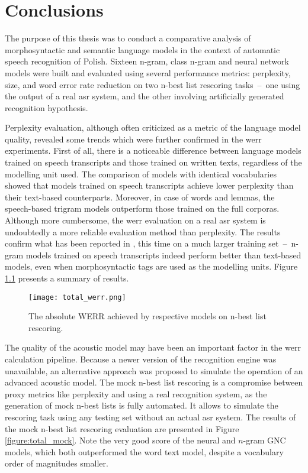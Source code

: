 \chapter{Conclusions}
\label{chapter:conclusion}
The purpose of this thesis was to conduct a comparative analysis of morphosyntactic and semantic language models in the context of automatic speech recognition of Polish. Sixteen n-gram, class n-gram and neural network models were built and evaluated using several performance metrics: perplexity, size, and word error rate reduction on two n-best list rescoring tasks~--~one using the output of a real \gls{asr} system, and the other involving artificially generated recognition hypothesis.

Perplexity evaluation, although often criticized as a metric of the language model quality, revealed some trends which were further confirmed in the \gls{werr} experiments. First of all, there is a noticeable difference between language models trained on speech transcripts and those trained on written texts, regardless of the modelling unit used. The comparison of models with identical vocabularies showed that models trained on speech transcripts achieve lower perplexity than their text-based counterparts. Moreover, in case of words and lemmas, the speech-based trigram models outperform those trained on the full corporas.
Although more cumbersome, the \gls{werr} evaluation on a real \gls{asr} system is undoubtedly a more reliable evaluation method than perplexity. The results confirm what has been reported in \cite{dziadzio2015comparison}, this time on a much larger training set~--~n-gram models trained on speech transcripts indeed perform better than text-based models, even when morphosyntactic tags are used as the modelling units. Figure \ref{figure:total} presents a summary of results.

\begin{figure}[!htbp]
	  \centering
	  \texttt{[image: total\_werr.png]}
	  \caption[The absolute WERR achieved by respective models on n-best list rescoring]{The absolute WERR achieved by respective models on n-best list rescoring.}
	      \label{figure:total}
\end{figure}

The quality of the acoustic model may have been an important factor in the \gls{werr} calculation pipeline. Because a newer version of the recognition engine was unavailable, an alternative approach was proposed to simulate the operation of an advanced acoustic model. The mock n-best list rescoring is a compromise between proxy metrics like perplexity and using a real recognition system, as the generation of mock n-best lists is fully automated. It allows to simulate the rescoring task using any testing set without an actual \gls{asr} system. The results of the mock n-best list rescoring evaluation are presented in Figure \ref{figure:total_mock}. Note the very good score of the neural and \mbox{$n$-gram} GNC models, which both outperformed the word text model, despite a vocabulary order of magnitudes smaller.

